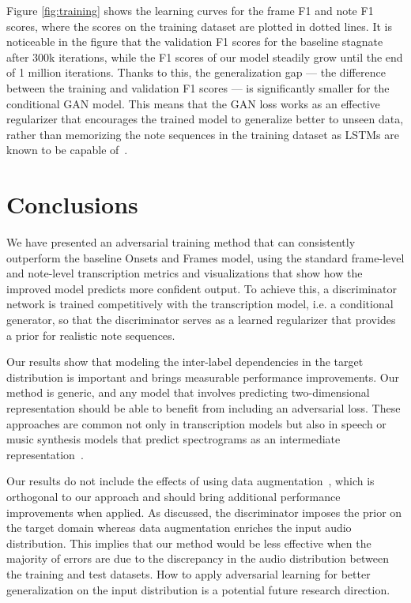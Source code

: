Figure \ref{fig:training} shows the learning curves for the frame F1 and note F1 scores, where the scores on the training dataset are plotted in dotted lines.
It is noticeable in the figure that the validation F1 scores for the baseline stagnate after 300k iterations, while the F1 scores of our model steadily grow until the end of 1 million iterations.
Thanks to this, the generalization gap --- the difference between the training and validation F1 scores --- is significantly smaller for the conditional GAN model.
This means that the GAN loss works as an effective regularizer that encourages the trained model to generalize better to unseen data, rather than memorizing the note sequences in the training dataset as LSTMs are known to be capable of~\cite{zaremba2015recurrent}.

\section{Conclusions}

We have presented an adversarial training method that can consistently outperform the baseline Onsets and Frames model, using the standard frame-level and note-level transcription metrics and visualizations that show how the improved model predicts more confident output.
To achieve this, a discriminator network is trained competitively with the transcription model, i.e. a conditional generator, so that the discriminator serves as a learned regularizer that provides a prior for realistic note sequences.


Our results show that modeling the inter-label dependencies in the target distribution is important and brings measurable performance improvements.
Our method is generic, and any model that involves predicting two-dimensional representation should be able to benefit from including an adversarial loss.
These approaches are common not only in transcription models but also in speech or music synthesis models that predict spectrograms as an intermediate representation~\cite{shen2018tacotron,kim2019synthesis}.


Our results do not include the effects of using data augmentation~\cite{hawthorne2019maestro}, which is orthogonal to our approach and should bring additional performance improvements when applied.
As discussed, the discriminator imposes the prior on the target domain whereas data augmentation enriches the input audio distribution.
This implies that our method would be less effective when the majority of errors are due to the discrepancy in the audio distribution between the training and test datasets.
How to apply adversarial learning for better generalization on the input distribution is a potential future research direction.


